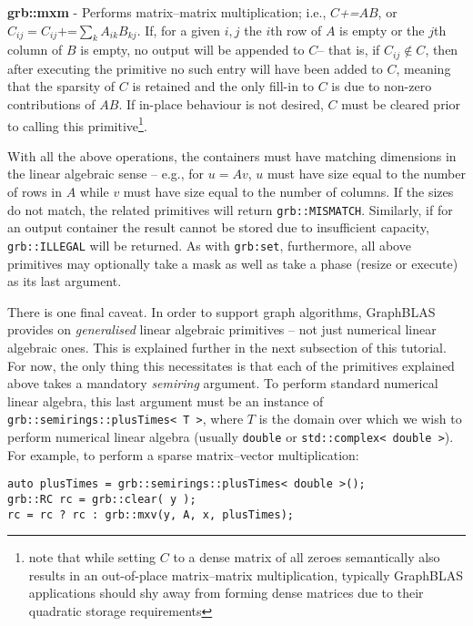     \textbf{grb::mxm} - Performs matrix--matrix multiplication; i.e., $C$\textit{+=}$AB$, or $C_{ij}=C_{ij}\textit{+=}\sum_{k}A_{ik}B_{kj}$. If, for a given $i,j$ the $i$th row of $A$ is empty or the $j$th column of $B$ is empty, no output will be appended to $C$-- that is, if $C_{ij}\notin C$, then after executing the primitive no such entry will have been added to $C$, meaning that the sparsity of $C$ is retained and the only fill-in to $C$ is due to non-zero contributions of $AB$. If in-place behaviour is not desired, $C$ must be cleared prior to calling this primitive\footnote{note that while setting $C$ to a dense matrix of all zeroes semantically also results in an out-of-place matrix--matrix multiplication, typically GraphBLAS applications should shy away from forming dense matrices due to their quadratic storage requirements}.\newline

    With all the above operations, the containers must have matching dimensions in the linear algebraic sense -- e.g., for $u=Av$, $u$ must have size equal to the number of rows in $A$ while $v$ must have size equal to the number of columns. If the sizes do not match, the related primitives will return \texttt{grb::MISMATCH}. Similarly, if for an output container the result cannot be stored due to insufficient capacity, \texttt{grb::ILLEGAL} will be returned. As with \texttt{grb:set}, furthermore, all above primitives may optionally take a mask as well as take a phase (resize or execute) as its last argument.

    There is one final caveat. In order to support graph algorithms, GraphBLAS provides on \emph{generalised} linear algebraic primitives -- not just numerical linear algebraic ones. This is explained further in the next subsection of this tutorial. For now, the only thing this necessitates is that each of the primitives explained above takes a mandatory \emph{semiring} argument. To perform standard numerical linear algebra, this last argument must be an instance of \texttt{grb::semirings::plusTimes< T >}, where $T$ is the domain over which we wish to perform numerical linear algebra (usually \texttt{double} or \texttt{std::complex< double >}). For example, to perform a sparse matrix--vector multiplication:
\begin{lstlisting}
auto plusTimes = grb::semirings::plusTimes< double >();
grb::RC rc = grb::clear( y );
rc = rc ? rc : grb::mxv(y, A, x, plusTimes);
\end{lstlisting}

